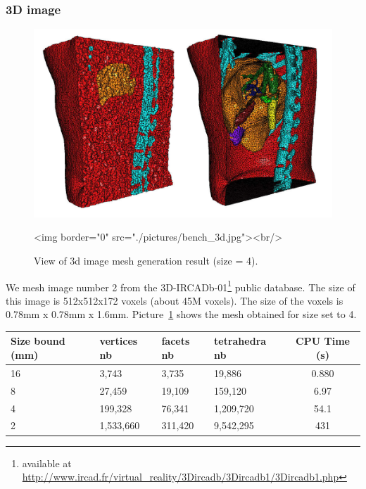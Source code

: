 \subsubsection{3D image}

\begin{figure}[ht]
\begin{center}
 \begin{ccTexOnly}
   \includegraphics[width=14cm]{Mesh_3/pictures/bench_3d.jpg}
 \end{ccTexOnly}
 \begin{ccHtmlOnly}
   <img border="0" src="./pictures/bench_3d.jpg"><br/>
 \end{ccHtmlOnly}
 \caption{View of 3d image mesh generation result (size = 4).}
  \label{figure:mesh_3_benchmark_3d_image}
\end{center}
\end{figure}

We mesh image number 2 from the 3D-IRCADb-01\footnote{available at \url{http://www.ircad.fr/virtual_reality/3Dircadb/3Dircadb1/3Dircadb1.php}} public database.
The size of this image is 512x512x172 voxels (about 45M voxels). The size of the voxels
is 0.78mm x 0.78mm x 1.6mm. Picture~\ref{figure:mesh_3_benchmark_3d_image}
shows the mesh obtained for size set to 4.

\begin{center}
\begin{tabular}{|l|l|l|l||c|}
  \hline
  Size bound (mm) & vertices nb & facets nb & tetrahedra nb & CPU Time (s) \\
  \hline
  16 & 3,743 & 3,735 & 19,886 & 0.880 \\
  8 & 27,459 & 19,109 & 159,120 & 6.97 \\
  4 & 199,328 & 76,341 & 1,209,720 & 54.1 \\
  2 & 1,533,660 & 311,420 & 9,542,295 & 431 \\
  \hline
\end{tabular}
\end{center}

